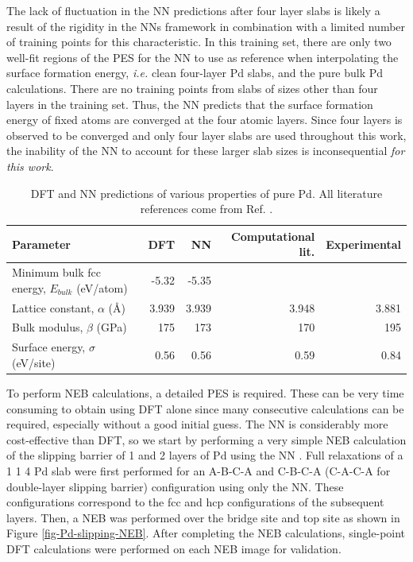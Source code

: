 \documentclass[12pt]{cmuthesis}
\begin{document}
The lack of fluctuation in the NN predictions after four layer slabs is likely a result of the rigidity in the NNs framework in combination with a limited number of training points for this characteristic. In this training set, there are only two well-fit regions of the PES for the NN to use as reference when interpolating the surface formation energy, \emph{i.e.} clean four-layer Pd slabs, and the pure bulk Pd calculations. There are no training points from slabs of sizes other than four layers in the training set. Thus, the NN predicts that the surface formation energy of fixed atoms are converged at the four atomic layers. Since four layers is observed to be converged and only four layer slabs are used throughout this work, the inability of the NN to account for these larger slab sizes is inconsequential \emph{for this work}.

\begin{table}[h]
\caption{\label{tbl-properties}
DFT and NN predictions of various properties of pure Pd. All literature references come from Ref. .}
\centering
\begin{tabular}{lrrrr}
Parameter & DFT & NN & Computational lit. & Experimental\\
\hline
Minimum bulk fcc energy, \(E_{bulk}\) (eV/atom) & -5.32 & -5.35 &  & \\
Lattice constant, \(\alpha\) (\AA{}) & 3.939 & 3.939 & 3.948 & 3.881\\
Bulk modulus, \(\beta\) (GPa) & 175 & 173 & 170 & 195\\
Surface energy, \(\sigma\) (eV/site) & 0.56 & 0.56 & 0.59 & 0.84\\
\end{tabular}
\end{table}

To perform NEB calculations, a detailed PES is required. These can be very time consuming to obtain using DFT alone since many consecutive calculations can be required, especially without a good initial guess. The NN is considerably more cost-effective than DFT, so we start by performing a very simple NEB calculation of the slipping barrier of 1 and 2 layers of Pd using the NN \cite{boes-2016-neural-networ}. Full relaxations of a 1 \texttimes{} 1 \texttimes{} 4 Pd slab were first performed for an A-B-C-A and C-B-C-A (C-A-C-A for double-layer slipping barrier) configuration using only the NN. These configurations correspond to the fcc and hcp configurations of the subsequent layers. Then, a NEB was performed over the bridge site and top site as shown in Figure \ref{fig-Pd-slipping-NEB}. After completing the NEB calculations, single-point DFT calculations were performed on each NEB image for validation.
\end{document}
